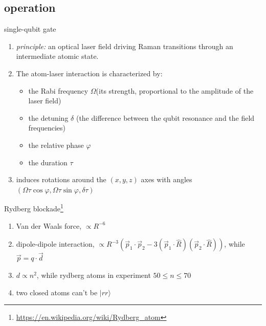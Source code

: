 \documentclass[18 pt]{beamer}
\begin{document}
\subsection{operation}
\begin{frame}{single-qubit gate}
  \begin{enumerate}[itemsep=10pt]
    \item \textit{principle:} an optical laser field driving Raman transitions through an intermediate atomic state.
    \item The atom-laser interaction is characterized by:
    \begin{itemize}[itemsep = 5pt]
      \item the Rabi frequency \(\Omega\)(its strength, proportional to the amplitude of the laser field)
      \item the detuning \(\delta\) (the difference between the qubit resonance and the field frequencies) 
      \item the relative phase \(\varphi\)
      \item the duration \(\tau \)
    \end{itemize}
    \item induces rotations around the \((x,y,z)\) axes with angles \((\Omega\tau\cos{\varphi},\Omega\tau\sin{\varphi},\delta\tau)\)
  \end{enumerate}
\end{frame}
\begin{frame}{Rydberg blockade\footnote{\url{https://en.wikipedia.org/wiki/Rydberg_atom}}}
  \begin{enumerate}
    \item Van der Waals force, \(\propto R^{-6}\)
    \item dipole-dipole interaction, \(\propto R^{-3} \left( \vec{p}_1 \cdot \vec{p}_2 - 3(\vec{p}_1 \cdot \hat{R})(\vec{p}_2 \cdot \hat{R}) \right)
    \), while \(\vec{p} = q\cdot \vec{d}\)
    \item $d\propto n^{2}$, while rydberg atoms in experiment $50\le n \le 70$
    \item two closed atoms can't be $|rr\rangle$
  \end{enumerate}
\end{frame}
\end{document}
